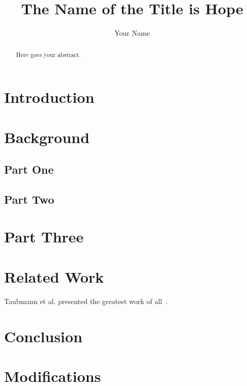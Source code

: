 \documentclass[sigconf]{acmart}
\begin{document}
\renewcommand\footnotetextcopyrightpermission[1]{} %
\pagestyle{plain} %


\title{The Name of the Title is Hope}
\author{Your Name}




\begin{abstract}
 Here goes your abstract.
\lipsum[1]
\end{abstract}







\maketitle

\section{Introduction}
\lipsum


\section{Background}
\subsection{Part One}

\lipsum[1-2]


\subsection{Part Two}

\lipsum[3-4]

\section{Part Three}

\lipsum[5-6]

\section{Related Work}

Taubmann et al. presented the greatest work of all~\cite{taubmann2016cloudphylactor}.



\section{Conclusion}

\section{Modifications}










\appendix
\end{document}
